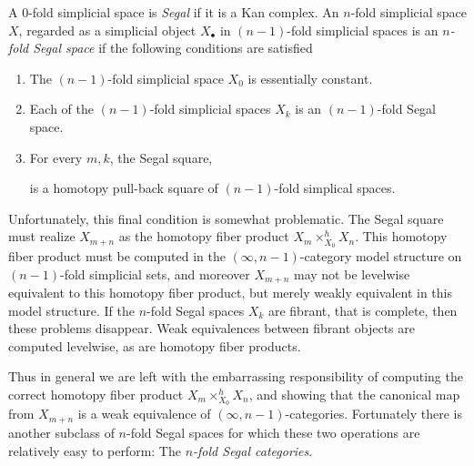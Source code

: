 \documentclass{amsart}
\begin{document}
\begin{definition}
	A $0$-fold simplicial space is {\em Segal} if it is a Kan complex. An $n$-fold simplicial space $X$, regarded as a simplicial object $X_\bullet$ in $(n-1)$-fold simplicial spaces is an {\em $n$-fold Segal space} if the following conditions are satisfied
		\begin{enumerate}
			\item The $(n-1)$-fold simplicial space $X_0$ is essentially constant.
			\item Each of the $(n-1)$-fold simplicial spaces $X_k$ is an $(n-1)$-fold Segal space.
			\item For every $m, k$, the Segal square,
			\begin{center}
			\end{center}
			is a homotopy pull-back square of $(n-1)$-fold simplical spaces. 
		\end{enumerate}
	\end{definition}

Unfortunately, this final condition is somewhat problematic. The Segal square must realize $X_{m+n}$ as the homotopy fiber product $X_m \times_{X_0}^h X_n$. This homotopy fiber product must be computed in the $(\infty, n-1)$-category model structure on $(n-1)$-fold simplicial sets, and moreover $X_{m+n}$ may not be levelwise equivalent to this homotopy fiber product, but merely weakly equivalent in this model structure. If the $n$-fold Segal spaces $X_k$ are fibrant, that is complete, then these problems disappear. Weak equivalences between fibrant objects are computed levelwise, as are homotopy fiber products. 

Thus in general we are left with the embarrassing responsibility of computing the correct homotopy fiber product $X_m \times_{X_0}^h X_n$, and showing that the canonical map from $X_{m+n}$ is a weak equivalence of $(\infty, n-1)$-categories. Fortunately there is another subclass of $n$-fold Segal spaces for which these two operations are relatively easy to perform: The {\em $n$-fold Segal categories}.
\end{document}
